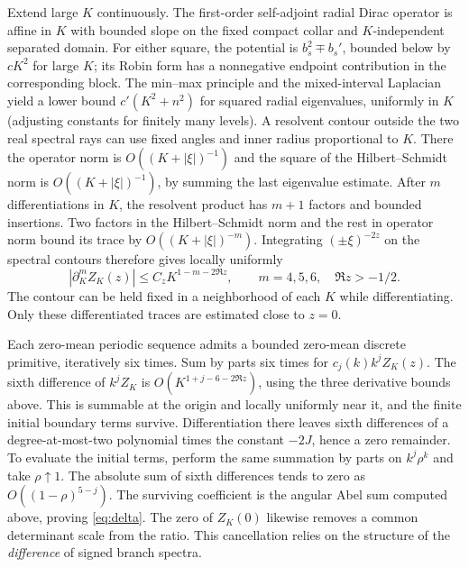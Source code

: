 Extend large $K$ continuously. The first-order self-adjoint radial Dirac operator is affine in $K$ with bounded slope on the fixed compact collar and $K$-independent separated domain. For either square, the potential is $b_s^2\mp b_s'$, bounded below by $cK^2$ for large $K$; its Robin form has a nonnegative endpoint contribution in the corresponding block. The min--max principle and the mixed-interval Laplacian yield a lower bound $c'(K^2+n^2)$ for squared radial eigenvalues, uniformly in $K$ (adjusting constants for finitely many levels). A resolvent contour outside the two real spectral rays can use fixed angles and inner radius proportional to $K$. There the operator norm is $O((K+|\xi|)^{-1})$ and the square of the Hilbert--Schmidt norm is $O((K+|\xi|)^{-1})$, by summing the last eigenvalue estimate. After $m$ differentiations in $K$, the resolvent product has $m+1$ factors and bounded insertions. Two factors in the Hilbert--Schmidt norm and the rest in operator norm bound its trace by $O((K+|\xi|)^{-m})$. Integrating $(\pm\xi)^{-2z}$ on the spectral contours therefore gives locally uniformly
\[
 |\partial_K^m Z_K(z)|\le C_z K^{1-m-2\Re z},\qquad m=4,5,6,\quad\Re z>-1/2.
\]
The contour can be held fixed in a neighborhood of each $K$ while differentiating. Only these differentiated traces are estimated close to $z=0$.

Each zero-mean periodic sequence admits a bounded zero-mean discrete primitive, iteratively six times. Sum by parts six times for $c_j(k)k^j Z_K(z)$. The sixth difference of $k^j Z_K$ is $O(K^{1+j-6-2\Re z})$, using the three derivative bounds above. This is summable at the origin and locally uniformly near it, and the finite initial boundary terms survive. Differentiation there leaves sixth differences of a degree-at-most-two polynomial times the constant $-2J$, hence a zero remainder. To evaluate the initial terms, perform the same summation by parts on $k^j\rho^k$ and take $\rho\uparrow1$. The absolute sum of sixth differences tends to zero as $O((1-\rho)^{5-j})$. The surviving coefficient is the angular Abel sum computed above, proving \eqref{eq:delta}. The zero of $Z_K(0)$ likewise removes a common determinant scale from the ratio. This cancellation relies on the structure of the \emph{difference} of signed branch spectra.
